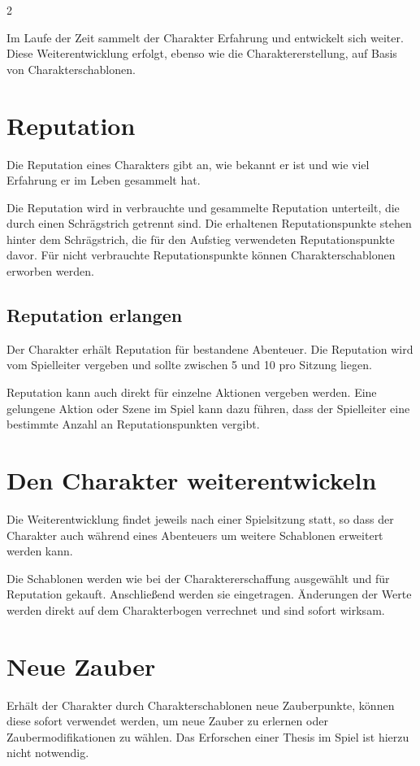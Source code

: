 \label{ch:advancement}

\begin{multicols}{2}

Im Laufe der Zeit sammelt der Charakter Erfahrung und entwickelt sich weiter. Diese Weiterentwicklung erfolgt, ebenso wie die Charaktererstellung, auf Basis von Charakterschablonen.

\section{Reputation}

Die Reputation eines Charakters gibt an, wie bekannt er ist und wie viel Erfahrung er im Leben gesammelt hat.

Die Reputation wird in verbrauchte und gesammelte Reputation unterteilt, die durch einen Schrägstrich getrennt sind. Die erhaltenen Reputationspunkte stehen hinter dem Schrägstrich, die für den Aufstieg verwendeten Reputationspunkte davor. Für nicht verbrauchte Reputationspunkte können Charakterschablonen erworben werden.

\subsection{Reputation erlangen}

Der Charakter erhält Reputation für bestandene Abenteuer. Die Reputation wird vom Spielleiter vergeben und sollte zwischen 5 und 10 pro Sitzung liegen.

Reputation kann auch direkt für einzelne Aktionen vergeben werden. Eine gelungene Aktion oder Szene im Spiel kann dazu führen, dass der Spielleiter eine bestimmte Anzahl an Reputationspunkten vergibt.

\section{Den Charakter weiterentwickeln}

Die Weiterentwicklung findet jeweils nach einer Spielsitzung statt, so dass der Charakter auch während eines Abenteuers um weitere Schablonen erweitert werden kann.

Die Schablonen werden wie bei der Charaktererschaffung ausgewählt und für Reputation gekauft. Anschließend werden sie eingetragen. Änderungen der Werte werden direkt auf dem Charakterbogen verrechnet und sind sofort wirksam.

\section{Neue Zauber}

Erhält der Charakter durch Charakterschablonen neue Zauberpunkte, können diese sofort verwendet werden, um neue Zauber zu erlernen oder Zaubermodifikationen zu wählen. Das Erforschen einer Thesis im Spiel ist hierzu nicht notwendig.
\end{multicols}
